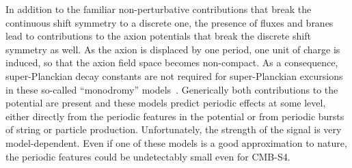

In addition to the familiar non-perturbative contributions that break the continuous shift symmetry to a discrete one, the presence of fluxes and branes lead to contributions to the axion potentials that break the discrete shift symmetry as well. As the axion is displaced by one period, one unit of charge is induced, so that the axion field space becomes non-compact. As a consequence, super-Planckian decay constants are not required for super-Planckian excursions in these so-called ``monodromy'' models~\cite{Silverstein:2008sg, McAllister:2008hb, Kaloper:2008fb, Berg:2009tg, Palti:2014kza,McAllister:2014mpa, Marchesano:2014mla, Blumenhagen:2015xpa,Hebecker:2015tzo}. Generically both contributions to the potential are present and these models predict periodic effects at some level, either directly from the periodic features in the potential or from periodic bursts of string or particle production. Unfortunately, the strength of the signal is very model-dependent. Even if one of these models is a good approximation to nature, the periodic features could be undetectably small even for CMB-S4.

